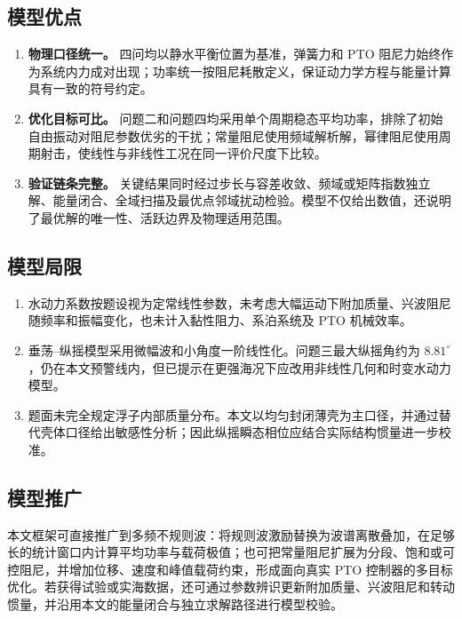 \documentclass[withoutpreface]{../../../templates/CUMCM2026-Complete-LaTeX/cumcmthesis}
\begin{document}
\subsection{模型优点}

\begin{enumerate}[leftmargin=3.2em]
  \item \textbf{物理口径统一。} 四问均以静水平衡位置为基准，弹簧力和 PTO 阻尼力始终作为系统内力成对出现；功率统一按阻尼耗散定义，保证动力学方程与能量计算具有一致的符号约定。
  \item \textbf{优化目标可比。} 问题二和问题四均采用单个周期稳态平均功率，排除了初始自由振动对阻尼参数优劣的干扰；常量阻尼使用频域解析解，幂律阻尼使用周期射击，使线性与非线性工况在同一评价尺度下比较。
  \item \textbf{验证链条完整。} 关键结果同时经过步长与容差收敛、频域或矩阵指数独立解、能量闭合、全域扫描及最优点邻域扰动检验。模型不仅给出数值，还说明了最优解的唯一性、活跃边界及物理适用范围。
\end{enumerate}

\subsection{模型局限}

\begin{enumerate}[leftmargin=3.2em]
  \item 水动力系数按题设视为定常线性参数，未考虑大幅运动下附加质量、兴波阻尼随频率和振幅变化，也未计入黏性阻力、系泊系统及 PTO 机械效率。
  \item 垂荡--纵摇模型采用微幅波和小角度一阶线性化。问题三最大纵摇角约为 $8.81^\circ$，仍在本文预警线内，但已提示在更强海况下应改用非线性几何和时变水动力模型。
  \item 题面未完全规定浮子内部质量分布。本文以均匀封闭薄壳为主口径，并通过替代壳体口径给出敏感性分析；因此纵摇瞬态相位应结合实际结构惯量进一步校准。
\end{enumerate}

\subsection{模型推广}

本文框架可直接推广到多频不规则波：将规则波激励替换为波谱离散叠加，在足够长的统计窗口内计算平均功率与载荷极值；也可把常量阻尼扩展为分段、饱和或可控阻尼，并增加位移、速度和峰值载荷约束，形成面向真实 PTO 控制器的多目标优化。若获得试验或实海数据，还可通过参数辨识更新附加质量、兴波阻尼和转动惯量，并沿用本文的能量闭合与独立求解路径进行模型校验。
\end{document}
